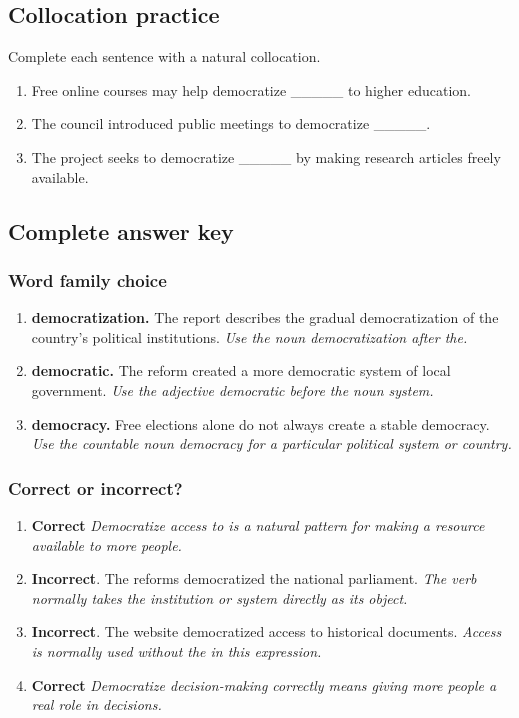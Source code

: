 \documentclass[11pt]{article}
\begin{document}
\subsection{Collocation practice}
Complete each sentence with a natural collocation.

\begin{enumerate}
  \item Free online courses may help democratize \_\_\_\_\_ to higher education.
  \item The council introduced public meetings to democratize \_\_\_\_\_.
  \item The project seeks to democratize \_\_\_\_\_ by making research articles freely available.
\end{enumerate}

\subsection{Complete answer key}
\subsubsection{Word family choice}
\begin{enumerate}
  \item \textbf{democratization.} The report describes the gradual democratization of the country's political institutions. \emph{Use the noun democratization after the.}
  \item \textbf{democratic.} The reform created a more democratic system of local government. \emph{Use the adjective democratic before the noun system.}
  \item \textbf{democracy.} Free elections alone do not always create a stable democracy. \emph{Use the countable noun democracy for a particular political system or country.}
\end{enumerate}

\subsubsection{Correct or incorrect?}
\begin{enumerate}
  \item \textbf{Correct} \emph{Democratize access to is a natural pattern for making a resource available to more people.}
  \item \textbf{Incorrect}. The reforms democratized the national parliament. \emph{The verb normally takes the institution or system directly as its object.}
  \item \textbf{Incorrect}. The website democratized access to historical documents. \emph{Access is normally used without the in this expression.}
  \item \textbf{Correct} \emph{Democratize decision-making correctly means giving more people a real role in decisions.}
\end{enumerate}
\end{document}
